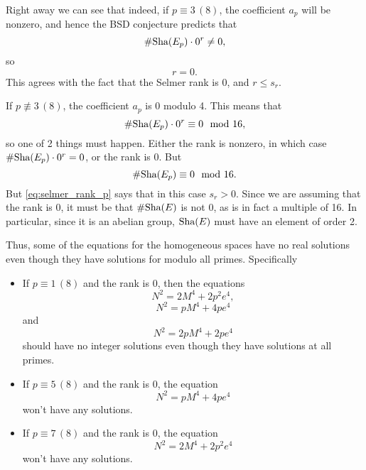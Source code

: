 \documentclass[12pt, a4paper]{amsart}
\begin{document}
Right away we can see that indeed, if $p \equiv 3 \, (8)$, the coefficient
$a_p$ will be nonzero, and hence the BSD conjecture predicts that
$$\#\text{\normalfont Sha}(E_p)\cdot 0^r \neq 0,$$
so $$r = 0.$$
This agrees with the fact that the Selmer rank is 0, and $r \leq s_r$.

If $p \not\equiv 3 \, (8)$, the coefficient $a_p$ is 0 modulo 4.
This means that
\[\#\text{\normalfont Sha}(E_p) \cdot 0^r \equiv 0 \mod{16},\]
so one of 2 things must happen. Either the rank is nonzero, in which case
$\#\text{\normalfont Sha}(E_p) \cdot 0^r = 0$, or the rank is 0. But
\[\#\text{\normalfont Sha}(E_p) \equiv 0 \mod{16}.\]
But \autoref{eq:selmer_rank_p} says that in this case $s_r > 0$. Since we are
assuming that the rank is 0, it must be that $\#\text{\normalfont Sha}(E)$ is not 0, as is in fact
a multiple of 16. In particular, since it is an abelian group, $\text{\normalfont Sha}(E)$ must
have an element of order 2.

Thus, some of the equations for the homogeneous spaces have no real solutions
even though they have solutions for modulo all primes. Specifically

\begin{itemize}
\item If $p \equiv 1 \, (8)$ and the rank is 0, then the equations
  \[N^2 = 2M^4 + 2p^2e^4,\]
  \[N^2 = pM^4 + 4pe^4\]
  and
  \[N^2 = 2pM^4 + 2pe^4\]
  should have no integer solutions even though they have solutions at all primes.

\item If $p \equiv 5 \, (8)$ and the rank is 0, the equation
  \[N^2 = pM^4 + 4pe^4\]
  won't have any solutions.

\item If $p \equiv 7 \, (8)$ and the rank is 0, the equation
  \[N^2 = 2M^4 + 2p^2e^4\]
  won't have any solutions.
\end{itemize}

\printbibliography
\end{document}
